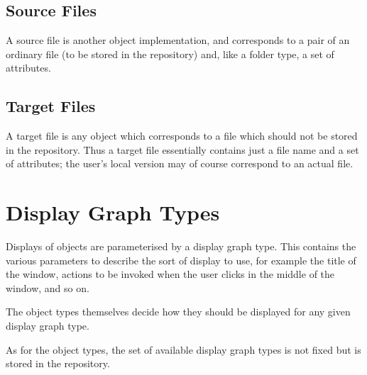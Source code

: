 \documentclass[a4paper]{article}
\begin{document}
\subsection{Source Files}
A source file is another object implementation, and corresponds to a pair of
an ordinary file (to be stored in the repository) and, like a folder type,
a set of attributes.
\subsection{Target Files}
A target file is any object which corresponds to a file which should not be 
stored in the repository.  Thus a target file essentially contains just a
file name and a set of attributes; the user's local version may of course
correspond to an actual file.

\section{Display Graph Types}
Displays of objects are parameterised by a display graph type.  This contains
the various parameters to describe the sort of display to use, for example
the title of the window, actions to be invoked when the user clicks in the
middle of the window, and so on.

The object types themselves decide how they should be displayed for any
given display graph type.

As for the object types, the set of available display graph types is not
fixed but is stored in the repository.
\end{document}
